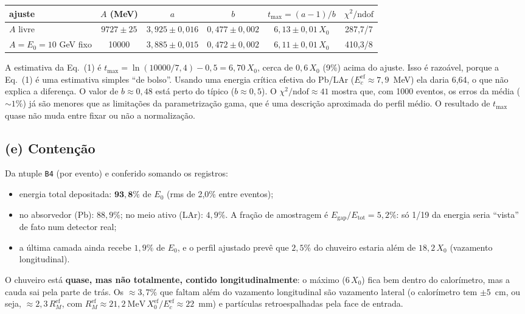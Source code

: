 \documentclass[a4paper,11pt]{article}
\begin{document}
\begin{table}[H]
\centering
\begin{tabular}{lccccc}
\toprule
ajuste & $A$ (MeV) & $a$ & $b$ & $t_\text{max} = (a-1)/b$ & $\chi^2/\text{ndof}$ \\
\midrule
$A$ livre & $9727 \pm 25$ & $3{,}925 \pm 0{,}016$ & $0{,}477 \pm 0{,}002$ & $6{,}13 \pm 0{,}01\,X_0$ & 287,7/7 \\
$A = E_0 = 10$ GeV fixo & 10000 & $3{,}885 \pm 0{,}015$ & $0{,}472 \pm 0{,}002$ & $6{,}11 \pm 0{,}01\,X_0$ & 410,3/8 \\
\bottomrule
\end{tabular}
\end{table}

A estimativa da Eq.~(1) é $t_\text{max} = \ln(10000/7{,}4) - 0{,}5 = 6{,}70\,X_0$, cerca de $0{,}6\,X_0$ (9\%) acima do
ajuste. Isso é razoável, porque a Eq.~(1) é uma estimativa simples ``de bolso''. Usando uma energia crítica efetiva do
Pb/LAr ($E_c^\text{ef} \approx 7{,}9$~MeV) ela daria 6,64, o que não explica a diferença. O valor de $b \approx 0{,}48$
está perto do típico ($b \approx 0{,}5$). O $\chi^2/\text{ndof} \approx 41$ mostra que, com 1000 eventos, os erros da
média ($\sim 1\%$) já são menores que as limitações da parametrização gama, que é uma descrição aproximada do perfil
médio. O resultado de $t_\text{max}$ quase não muda entre fixar ou não a normalização.

\subsection{(e) Contenção}

Da ntuple \texttt{B4} (por evento) e conferido somando os registros:
\begin{itemize}
  \item energia total depositada: $\mathbf{93{,}8\%}$ de $E_0$ (rms de 2,0\% entre eventos);
  \item no absorvedor (Pb): $88{,}9\%$; no meio ativo (LAr): $4{,}9\%$. A fração de amostragem é $E_\text{gap}/E_\text{tot} = 5{,}2\%$:
    só 1/19 da energia seria ``vista'' de fato num detector real;
  \item a última camada ainda recebe $1{,}9\%$ de $E_0$, e o perfil ajustado prevê que $2{,}5\%$ do chuveiro estaria
    além de $18{,}2\,X_0$ (vazamento longitudinal).
\end{itemize}

\noindent O chuveiro está \textbf{quase, mas não totalmente, contido longitudinalmente}: o máximo ($6\,X_0$) fica bem
dentro do calorímetro, mas a cauda sai pela parte de trás. Os $\approx 3{,}7\%$ que faltam além do vazamento longitudinal são
vazamento lateral (o calorímetro tem $\pm 5$~cm, ou seja, $\approx 2{,}3\,R_M^\text{ef}$, com $R_M^\text{ef} \approx 21{,}2~\text{MeV}\,X_0^\text{ef}/E_c^\text{ef} \approx 22$~mm)
e partículas retroespalhadas pela face de entrada.
\end{document}
